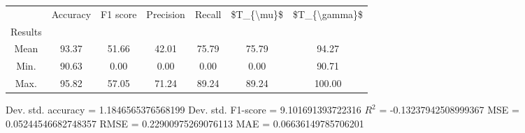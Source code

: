 \begin{tabular}{|c|c|c|c|c|c|c|}
\toprule
{} &  Accuracy &  F1 score &  Precision &  Recall &  \$T\_\{\textbackslash mu\}\$ &  \$T\_\{\textbackslash gamma\}\$ \\
Results &           &           &            &         &            &               \\
\hline
Mean    &     93.37 &     51.66 &      42.01 &   75.79 &      75.79 &         94.27 \\
Min.    &     90.63 &      0.00 &       0.00 &    0.00 &       0.00 &         90.71 \\
Max.    &     95.82 &     57.05 &      71.24 &   89.24 &      89.24 &        100.00 \\
\bottomrule
\end{tabular}

 Dev. std. accuracy = 1.1846565376568199
 Dev. std. F1-score = 9.101691393722316
 $R^2$ = -0.13237942508999367
 MSE = 0.05244546682748357
 RMSE = 0.22900975269076113
 MAE = 0.06636149785706201